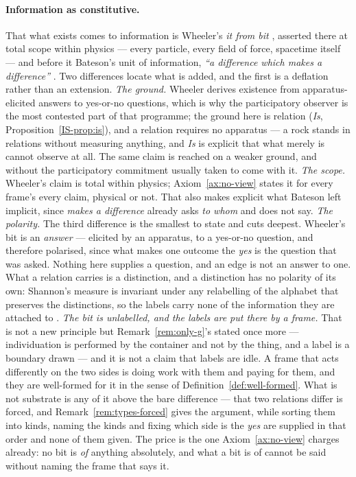\documentclass[11pt,a4paper]{article}
\theoremstyle{remark}\newtheorem{remark}[definition]{Remark}
\begin{document}
\paragraph{Information as constitutive.} That what exists comes to information is Wheeler's \emph{it
from bit} \citep{wheeler1990}, asserted there at total scope within physics --- every particle, every
field of force, spacetime itself --- and before it Bateson's unit of information, \emph{``a difference
which makes a difference''} \citep{bateson1972}. Two differences locate what is added, and the first is
a deflation rather than an extension. \emph{The ground.} Wheeler derives existence from
apparatus-elicited answers to yes-or-no questions, which is why the participatory observer is the most
contested part of that programme; the ground here is relation (\emph{Is}, Proposition~\ref{IS-prop:is}), and a relation
requires no apparatus --- a rock stands in relations without measuring anything, and \emph{Is} is
explicit that what merely is cannot observe at all. The same claim is reached on a weaker ground, and
without the participatory commitment usually taken to come with it. \emph{The scope.} Wheeler's claim is
total within physics; Axiom~\ref{ax:no-view} states it for every frame's every claim, physical or not. That also
makes explicit what Bateson left implicit, since \emph{makes a difference} already asks \emph{to whom}
and does not say. \emph{The polarity.} The third difference is the smallest to state and cuts deepest.
Wheeler's bit is an \emph{answer} --- elicited by an apparatus, to a yes-or-no question, and therefore
polarised, since what makes one outcome the \emph{yes} is the question that was asked. Nothing here
supplies a question, and an edge is not an answer to one. What a relation carries is a distinction, and
a distinction has no polarity of its own: Shannon's measure is invariant under any relabelling of the
alphabet that preserves the distinctions, so the labels carry none of the information they are attached
to \citep{shannon1948}. \emph{The bit is unlabelled, and the labels are put there by a frame.} That is
not a new principle but Remark~\ref{rem:only-g}'s stated once more --- individuation is performed by
the container and not by the thing, and a label is a boundary drawn --- and it is not a claim that
labels are idle. A frame that acts differently on the two sides is doing work with them and paying for
them, and they are well-formed for it in the sense of Definition~\ref{def:well-formed}. What is not
substrate is any of it above the bare difference --- that two relations differ is forced, and
Remark~\ref{rem:types-forced} gives the argument, while sorting them into kinds, naming the kinds and
fixing which side is the \emph{yes} are supplied in that order and none of them given. The price is the one Axiom~\ref{ax:no-view} charges already: no bit is \emph{of} anything
absolutely, and what a bit is of cannot be said without naming the frame that says it.
\end{document}
